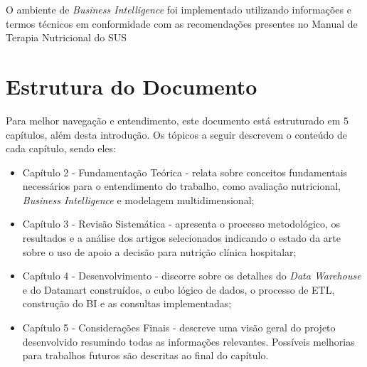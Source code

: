 O ambiente de \textit{Business Intelligence} foi implementado utilizando informações e termos técnicos em conformidade com as recomendações presentes no Manual de Terapia Nutricional do SUS \cite{manualnutricao2016}

\section{Estrutura do Documento}\label{sec-divisoes}
Para melhor navegação e entendimento, este documento está estruturado em 5 capítulos, além desta introdução. Os tópicos a seguir descrevem o conteúdo de cada capítulo, sendo eles:
\begin{itemize}
 \item Capítulo 2 - Fundamentação Teórica - relata sobre conceitos fundamentais necessários para o entendimento do trabalho, como avaliação nutricional, \textit{Business Intelligence} e modelagem multidimensional;

 \item Capítulo 3 - Revisão Sistemática - apresenta o processo metodológico, os resultados e a análise dos artigos selecionados indicando o estado da arte sobre o uso de apoio a decisão para nutrição clínica hospitalar;

 \item Capítulo 4 - Desenvolvimento - discorre sobre os detalhes do \textit{Data Warehouse} e do Datamart construídos, o cubo lógico de dados, o processo de ETL, construção do BI e as consultas implementadas;
 
 \item Capítulo 5 - Considerações Finais - descreve uma visão geral do projeto desenvolvido resumindo todas as informações relevantes. Possíveis melhorias para trabalhos futuros são descritas ao final do capítulo.
\end{itemize}